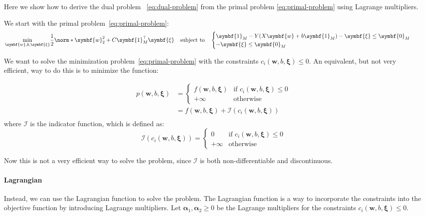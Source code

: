 Here we show how to derive the dual problem ~\eqref{eq:dual-problem} from the primal problem \eqref{eq:primal-problem} using Lagrange multipliers.

We start with the primal problem~\eqref{eq:primal-problem}:
\begin{align}
	\min_{\symbf{w}, b, \symbf{\xi}} & \frac{1}{2} \norm*{\symbf{w}}_2^2 + C\symbf{1}_M^\top \symbf{\xi}
	\quad \text{subject to} \quad
	\begin{cases}
		\symbf{1}_M - Y(X\symbf{w} + b\symbf{1}_M) - \symbf{\xi} \leq \symbf{0}_M \\
		-\symbf{\xi} \leq \symbf{0}_M
	\end{cases}
\end{align}

We want to solve the minimization problem~\eqref{eq:primal-problem} with the constraints \(c_i(\symbf{w}, b, \symbf{\xi}) \leq 0\).
An equivalent, but not very efficient, way to do this is to minimize the function:

\begin{align*}\label{eq:penalty-function}
	p(\symbf{w}, b, \symbf{\xi}) & =
	\begin{cases}
		f(\symbf{w}, b, \symbf{\xi}) & \text{if } c_i(\symbf{w}, b, \symbf{\xi}) \leq 0 \\
		+\infty                      & \text{otherwise}
	\end{cases}                             \\
	                             & = f(\symbf{w}, b, \symbf{\xi}) + \mathcal{I}(c_i(\symbf{w}, b, \symbf{\xi})) \\
\end{align*}
where \(\mathcal{I}\) is the indicator function, which is defined as:
\[
	\mathcal{I}(c_i(\symbf{w}, b, \symbf{\xi})) =
	\begin{cases}
		0       & \text{if } c_i(\symbf{w}, b, \symbf{\xi}) \leq 0 \\
		+\infty & \text{otherwise}
	\end{cases}
\]

Now this is not a very efficient way to solve the problem, since \(\mathcal{I}\) is both non-differentiable and discontinuous.

\paragraph{Lagrangian}
Instead, we can use the Lagrangian function to solve the problem. The Lagrangian function is a way to incorporate the constraints into the objective function by introducing Lagrange multipliers.
Let \(\symbf{\alpha}_1, \symbf{\alpha}_2 \geq 0\) be the Lagrange multipliers for the constraints \(c_i(\symbf{w}, b, \symbf{\xi}) \leq 0\).

